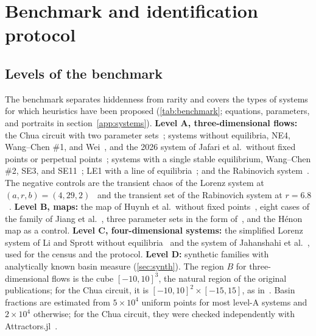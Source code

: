 \section{Benchmark and identification protocol}\label{sec:bench}

\subsection{Levels of the benchmark}\label{sec:levels}

The benchmark separates hiddenness from rarity and covers the types of systems for which heuristics have been proposed (\cref{tab:benchmark}; equations, parameters, and portraits in section~\ref{app:systems}).
\textbf{Level A, three-dimensional flows:} the Chua circuit with two parameter sets~\cite{Leonov2011PLA,GuanXie2025,Kuznetsov2023Chua}; systems without equilibria, NE4, Wang--Chen \#1, and Wei~\cite{Wei2011,JafariSprottGolpayegani2013}, and the 2026 system of Jafari et al.\ without fixed points or perpetual points~\cite{Jafari2026NoPP}; systems with a single stable equilibrium, Wang--Chen \#2, SE3, and SE11~\cite{WangChen2012,Molaie2013}; LE1 with a line of equilibria~\cite{JafariSprott2013}; and the Rabinovich system~\cite{Kuznetsov2018Rabinovich}. The negative controls are the transient chaos of the Lorenz system at $(a,r,b)=(4,29,2)$~\cite{YorkeYorke1979} and the transient set of the Rabinovich system at $r=6.8$~\cite{SprottMunmuangsaen2018Comment}.
\textbf{Level B, maps:} the map of Huynh et al.\ without fixed points~\cite{Huynh2019}, eight cases of the family of Jiang et al.~\cite{Jiang2016Maps}, three parameter sets in the form of~\cite{Ouannas2018}, and the H\'enon map as a control.
\textbf{Level C, four-dimensional systems:} the simplified Lorenz system of Li and Sprott without equilibria~\cite{LiSprott2014} and the system of Jahanshahi et al.~\cite{Jahanshahi2019}, used for the census and the protocol.
\textbf{Level D:} synthetic families with analytically known basin measure (\cref{sec:synth}).
The region $B$ for three-dimensional flows is the cube $[-10,10]^3$, the natural region of the original publications; for the Chua circuit, it is $[-10,10]^2\times[-15,15]$, as in~\cite{Zelinka2016}. Basin fractions are estimated from $5\times10^4$ uniform points for most level-A systems and $2\times10^4$ otherwise; for the Chua circuit, they were checked independently with Attractors.jl~\cite{Datseris2018JOSS,DatserisWagemakers2022}.

